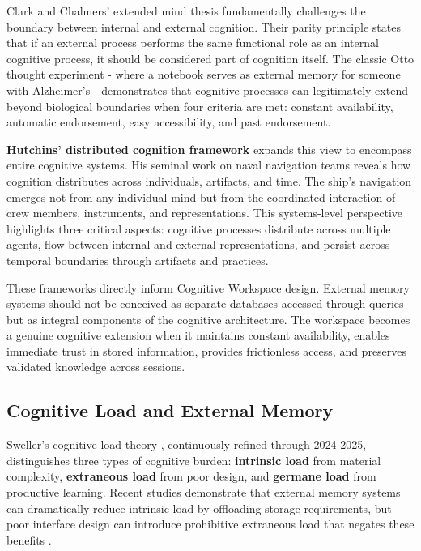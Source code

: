 \documentclass[10pt,twocolumn]{article}
\begin{document}
Clark and Chalmers' extended mind thesis \cite{clark1998extended} fundamentally challenges the boundary between internal and external cognition. Their parity principle states that if an external process performs the same functional role as an internal cognitive process, it should be considered part of cognition itself. The classic Otto thought experiment - where a notebook serves as external memory for someone with Alzheimer's - demonstrates that cognitive processes can legitimately extend beyond biological boundaries when four criteria are met: constant availability, automatic endorsement, easy accessibility, and past endorsement.

\textbf{Hutchins' distributed cognition framework} \cite{hutchins1995cognition} expands this view to encompass entire cognitive systems. His seminal work on naval navigation teams reveals how cognition distributes across individuals, artifacts, and time. The ship's navigation emerges not from any individual mind but from the coordinated interaction of crew members, instruments, and representations. This systems-level perspective highlights three critical aspects: cognitive processes distribute across multiple agents, flow between internal and external representations, and persist across temporal boundaries through artifacts and practices.

These frameworks directly inform Cognitive Workspace design. External memory systems should not be conceived as separate databases accessed through queries but as integral components of the cognitive architecture. The workspace becomes a genuine cognitive extension when it maintains constant availability, enables immediate trust in stored information, provides frictionless access, and preserves validated knowledge across sessions.

\subsection{Cognitive Load and External Memory}

Sweller's cognitive load theory \cite{sweller1988cognitive, sweller2019cognitive}, continuously refined through 2024-2025, distinguishes three types of cognitive burden: \textbf{intrinsic load} from material complexity, \textbf{extraneous load} from poor design, and \textbf{germane load} from productive learning. Recent studies demonstrate that external memory systems can dramatically reduce intrinsic load by offloading storage requirements, but poor interface design can introduce prohibitive extraneous load that negates these benefits \cite{paas2003cognitive}.
\end{document}
